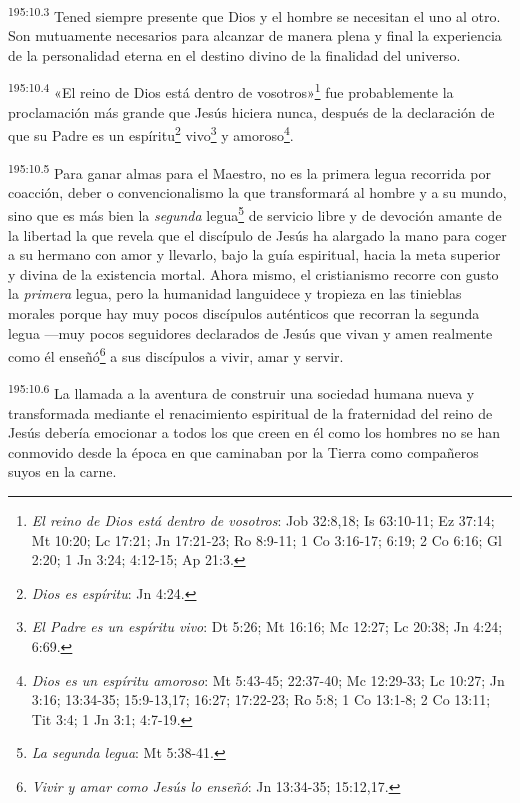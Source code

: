 \par
\textsuperscript{195:10.3} Tened siempre presente que Dios y el hombre se necesitan el uno al otro. Son mutuamente necesarios para alcanzar de manera plena y final la experiencia de la personalidad eterna en el destino divino de la finalidad del universo.

\par
\textsuperscript{195:10.4} «El reino de Dios está dentro de vosotros»\footnote{\textit{El reino de Dios está dentro de vosotros}: Job 32:8,18; Is 63:10-11; Ez 37:14; Mt 10:20; Lc 17:21; Jn 17:21-23; Ro 8:9-11; 1 Co 3:16-17; 6:19; 2 Co 6:16; Gl 2:20; 1 Jn 3:24; 4:12-15; Ap 21:3.} fue probablemente la proclamación más grande que Jesús hiciera nunca, después de la declaración de que su Padre es un espíritu\footnote{\textit{Dios es espíritu}: Jn 4:24.} vivo\footnote{\textit{El Padre es un espíritu vivo}: Dt 5:26; Mt 16:16; Mc 12:27; Lc 20:38; Jn 4:24; 6:69.} y amoroso\footnote{\textit{Dios es un espíritu amoroso}: Mt 5:43-45; 22:37-40; Mc 12:29-33; Lc 10:27; Jn 3:16; 13:34-35; 15:9-13,17; 16:27; 17:22-23; Ro 5:8; 1 Co 13:1-8; 2 Co 13:11; Tit 3:4; 1 Jn 3:1; 4:7-19.}.

\par
\textsuperscript{195:10.5} Para ganar almas para el Maestro, no es la primera legua recorrida por coacción, deber o convencionalismo la que transformará al hombre y a su mundo, sino que es más bien la \textit{segunda} legua\footnote{\textit{La segunda legua}: Mt 5:38-41.} de servicio libre y de devoción amante de la libertad la que revela que el discípulo de Jesús ha alargado la mano para coger a su hermano con amor y llevarlo, bajo la guía espiritual, hacia la meta superior y divina de la existencia mortal. Ahora mismo, el cristianismo recorre con gusto la \textit{primera} legua, pero la humanidad languidece y tropieza en las tinieblas morales porque hay muy pocos discípulos auténticos que recorran la segunda legua ---muy pocos seguidores declarados de Jesús que vivan y amen realmente como él enseñó\footnote{\textit{Vivir y amar como Jesús lo enseñó}: Jn 13:34-35; 15:12,17.} a sus discípulos a vivir, amar y servir.

\par
\textsuperscript{195:10.6} La llamada a la aventura de construir una sociedad humana nueva y transformada mediante el renacimiento espiritual de la fraternidad del reino de Jesús debería emocionar a todos los que creen en él como los hombres no se han conmovido desde la época en que caminaban por la Tierra como compañeros suyos en la carne.

